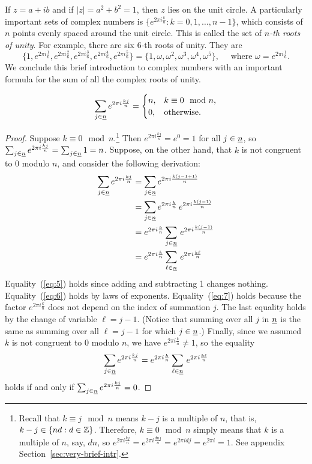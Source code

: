 If $z = a+ib$ and if $|z| = a^2 + b^2 = 1$, then $z$ lies on the unit circle.
A particularly important sets of complex numbers is $\{e^{2\pi i\frac{k}{n}} : k = 0, 1, \dots, n-1\}$,
which consists of $n$ points evenly spaced around the unit circle.
This is called the set of \emph{$n$-th roots of unity}.  
For example, there are six $6$-th roots of unity.  They are
\[
\{1, e^{2\pi i\frac{1}{6}}, e^{2\pi i\frac{2}{6}}, e^{2\pi i\frac{3}{6}}, e^{2\pi i\frac{4}{6}}, e^{2\pi i\frac{5}{6}}\} = 
\{1, \omega, \omega^2, \omega^3, \omega^4, \omega^5\}, 
\quad \text{ where $\omega = e^{2\pi i\frac{1}{6}}$.}
\]
We conclude this brief introduction to complex numbers with an important formula
for the sum of all the complex roots of unity.
\begin{lemma}
  \begin{equation}
\label{eq:sum-roots-unity}
\sum_{j\in \underline{n}} e^{2\pi i \frac{kj}{n}} = 
\begin{cases}
  n, & k \equiv 0 \mod n,\\
  0, & \mathrm{ otherwise}.
\end{cases}
  \end{equation}
\end{lemma}
\begin{proof}
  Suppose $k\equiv 0 \mod n$.\footnote{Recall that $k \equiv j \mod n$ 
means $k-j$ is a multiple of $n$, that is, $k-j \in \{nd: d\in \mathbb Z\}$. 
Therefore, $k\equiv 0 \mod n$ simply means that $k$ is a multiple of 
$n$, say, $dn$, so $e^{2\pi i \frac{kj}{n}} = e^{2\pi i \frac{dnj}{n}} = e^{2\pi i dj} = e^{2\pi i}
= 1$. See appendix Section~\ref{sec:very-brief-intr}.} 
Then $e^{2\pi i \frac{kj}{n}} = e^0 = 1$ for all $j\in \underline{n}$, so 
$\sum_{j\in \underline{n}} e^{2\pi i \frac{kj}{n}} = \sum_{j\in \underline{n}} 1 = n$.
Suppose, on the other hand, that $k$ is not congruent to $0$ modulo $n$, 
and consider the following derivation: 
\begin{align}
\label{eq:5}
  \sum_{j\in \underline{n}} e^{2\pi i \frac{kj}{n}} &= \sum_{j\in \underline{n}} e^{2\pi i \frac{k(j-1 + 1)}{n}} \\
\label{eq:6}
 &= \sum_{j\in \underline{n}} e^{2\pi i \frac{k}{n}} \,e^{2\pi i \frac{k(j-1)}{n}}\\
\label{eq:7}
 &= e^{2\pi i \frac{k}{n}} \sum_{j\in \underline{n}}  \,e^{2\pi i \frac{k(j-1)}{n}}\\
\label{eq:8}
 &= e^{2\pi i \frac{k}{n}} \sum_{\ell \in \underline{n}}  \,e^{2\pi i \frac{k\ell}{n}}
\end{align}
Equality~(\ref{eq:5}) holds since adding and subtracting 1 changes nothing.
Equality~(\ref{eq:6}) holds by laws of exponents.
Equality~(\ref{eq:7}) holds because the factor $e^{2\pi i \frac{k}{n}}$ does not 
depend on the index of summation $j$. 
The last equality holds by the change of variable $\ell = j-1$. 
(Notice that summing over all $j$ in $\underline{n}$ is the same as summing over all
$\ell = j-1$ for which $j \in \underline{n}$.)
Finally, since we assumed $k$ is not congruent to $0$ modulo $n$, 
we have $e^{2\pi i \frac{k}{n}} \neq 1$, so the equality
\[
  \sum_{j\in \underline{n}} e^{2\pi i \frac{kj}{n}} 
= e^{2\pi i \frac{k}{n}} \sum_{\ell \in \underline{n}}  \,e^{2\pi i \frac{k\ell}{n}}
\]
holds if and only if  $ \sum_{j\in \underline{n}} e^{2\pi i \frac{kj}{n}} =0$.
\end{proof}
